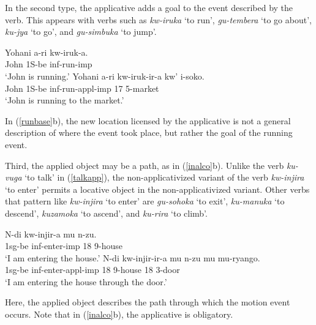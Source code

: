 \documentclass[output=paper]{langsci/langscibook}
\begin{document}
In the second type, the applicative adds a {\sc goal} to the event described by the verb. This appears with verbs such as \emph{kw-iruka} `to run', \emph{gu-tembera} `to go about', \emph{ku-jya} `to go', and  \emph{gu-simbuka} `to jump'.
	\begin{exe}
		\ex\label{runbase}\begin{xlist}
		\ex\gll Yohani a-ri kw-iruk-a.\\	
				John 1S-be {\sc inf}-run-{\sc imp}\\
				\glt `John is running.'
		\ex\gll Yohani a-ri kw-iruk-ir-a kw' i-soko.\\
				John 	1S-{\sc be} {\sc inf-}run-{\sc appl-imp} 17 5-market \\
				\glt `John is running to the market.'
		\end{xlist}
		\end{exe}
%
 In (\ref{runbase}b), the new location licensed by the applicative is not a general description of where the event took place, but rather the {\sc goal}  of the running event.
 
 Third, the applied object may be a {\sc path}, as in (\ref{inalco}b). Unlike the verb \emph{ku-vuga} `to talk' in (\ref{talkapp}), the non-applicativized variant of the verb \emph{kw-injira} `to enter' permits a {\sc locative} object in the non-applicativized variant.  Other verbs that pattern like \emph{kw-injira} `to enter' are \emph{gu-sohoka} `to exit', \emph{ku-manuka} `to descend', \emph{kuzamoka} `to ascend', and \emph{ku-rira} `to climb'.

\begin{exe}
	\ex\label{inalco}\begin{xlist}
		\ex\gll N-di kw-injir-a mu n-zu.\\
				1{\sc sg-be} {\sc inf-}enter-{\sc imp} 18 9-house\\
				\glt `I am entering the house.'
		\ex\gll N-di kw-injir-ir-a mu n-zu mu mu-ryango.\\
				1{\sc sg-be} {\sc inf-}enter-{\sc appl-imp} 18 9-house 18 3-door\\
				\glt `I am entering the house through the door.'
	\end{xlist}
\end{exe}
%
 Here, the applied object describes the {\sc path}  through which the motion event occurs. Note that in (\ref{inalco}b), the applicative is obligatory.%
\end{document}
